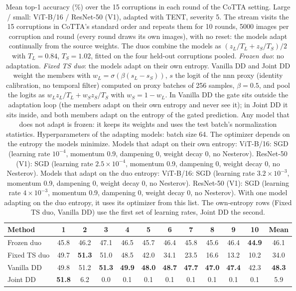 \begin{table}[t]
    \centering
    \small
    \setlength{\tabcolsep}{3.2pt}
    \caption{Mean top-1 accuracy (\%) over the 15 corruptions in each round of the CoTTA setting. Large / small: ViT-B/16 / ResNet-50 (V1), adapted with TENT, severity 5. The stream visits the 15 corruptions in CoTTA's standard order and repeats them for 10 rounds, 5000 images per corruption and round (every round draws its own images), with no reset: the models adapt continually from the source weights. The duos combine the models as $(z_L / T_L + z_S / T_S) / 2$ with $T_L = 0.84$, $T_S = 1.02$, fitted on the four held-out corruptions pooled. \emph{Frozen duo}: no adaptation. \emph{Fixed TS duo}: the models adapt on their own entropy. Vanilla DD and Joint DD weight the members with $w_L = \sigma(\beta (s_L - s_S))$, $s$ the logit of the nnn proxy (identity calibration, no temporal filter) computed on proxy batches of 256 samples, $\beta = 0.5$, and pool the logits as $w_L z_L / T_L + w_S z_S / T_S$ with $w_S = 1 - w_L$. In Vanilla DD the gate sits outside the adaptation loop (the members adapt on their own entropy and never see it); in Joint DD it sits inside, and both members adapt on the entropy of the gated prediction. Any model that does not adapt is frozen: it keeps its weights and uses the test batch's normalization statistics. Hyperparameters of the adapting models: batch size 64. The optimizer depends on the entropy the models minimize. Models that adapt on their own entropy: ViT-B/16: SGD (learning rate $10^{-4}$, momentum 0.9, dampening 0, weight decay 0, no Nesterov). ResNet-50 (V1): SGD (learning rate $2.5 \times 10^{-4}$, momentum 0.9, dampening 0, weight decay 0, no Nesterov). Models that adapt on the duo entropy: ViT-B/16: SGD (learning rate $3.2 \times 10^{-3}$, momentum 0.9, dampening 0, weight decay 0, no Nesterov). ResNet-50 (V1): SGD (learning rate $4 \times 10^{-3}$, momentum 0.9, dampening 0, weight decay 0, no Nesterov). With one model adapting on the duo entropy, it uses its optimizer from this list. The own-entropy rows (Fixed TS duo, Vanilla DD) use the first set of learning rates, Joint DD the second.}
    \label{tab:recurring_rounds:vitb16_rn50v1__tent_bn__R10_n5000_std_seed0__nnn_bt256_beta0.5}
    \begin{tabular}{l|cccccccccc|c}
        \toprule
        Method & 1 & 2 & 3 & 4 & 5 & 6 & 7 & 8 & 9 & 10 & Mean \\
        \midrule
        Frozen duo & 45.8 & 46.2 & 47.1 & 46.5 & 45.7 & 46.4 & 45.8 & 45.6 & 46.4 & \textbf{44.9} & 46.1 \\
        Fixed TS duo & 49.7 & \textbf{51.3} & 51.0 & 48.5 & 42.0 & 34.1 & 23.5 & 16.6 & 13.2 & 10.2 & 34.0 \\
        Vanilla DD & 49.8 & 51.2 & \textbf{51.3} & \textbf{49.9} & \textbf{48.0} & \textbf{48.7} & \textbf{47.7} & \textbf{47.0} & \textbf{47.4} & 42.3 & \textbf{48.3} \\
        Joint DD & \textbf{51.8} & 6.2 & 0.0 & 0.1 & 0.1 & 0.1 & 0.1 & 0.1 & 0.1 & 0.1 & 5.9 \\
        \bottomrule
    \end{tabular}
\end{table}
